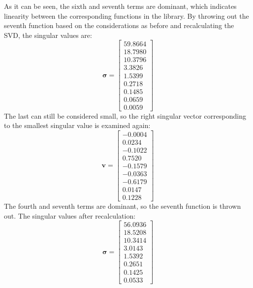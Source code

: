 ﻿\documentclass[12pt,a4paper]{article}
\begin{document}
As it can be seen, the sixth and seventh terms are dominant,
which indicates linearity between the corresponding functions in the library.
By throwing out the seventh function based on the considerations as before
and recalculating the SVD, the singular values are:
\begin{equation}
    \bm{\sigma} = \begin{bmatrix}
    59.8664 \\
    18.7980 \\
    10.3796 \\
    3.3826 \\
    1.5399 \\
    0.2718 \\
    0.1485 \\
    0.0659 \\
    0.0059
    \end{bmatrix}
\end{equation}
The last can still be considered small, so the right singular vector corresponding
to the smallest singular value is examined again:
\begin{equation}
    \bm{v} = \begin{bmatrix}
    -0.0004 \\
    0.0234 \\
    -0.1022 \\
    0.7520 \\
    -0.1579 \\
    -0.0363 \\
    -0.6179 \\
    0.0147 \\
    0.1228
    \end{bmatrix}
\end{equation}
The fourth and seventh terms are dominant, so the seventh function is thrown out. 
The singular values after recalculation:
\begin{equation}
    \bm{\sigma} = \begin{bmatrix}
    56.0936 \\
    18.5208 \\
    10.3414 \\
    3.0143 \\
    1.5392 \\
    0.2651 \\
    0.1425 \\
    0.0533
    \end{bmatrix}
\end{equation}

\newpage
\end{document}
